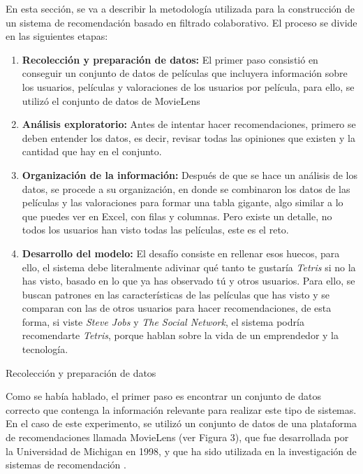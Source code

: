 \documentclass[letterpaper,10pt,final,hyphenatedtitles]{papertexKS}
\begin{document}
\begin{news}{2}
	En esta sección, se va a describir la metodología utilizada para la construcción de un sistema de recomendación basado en filtrado colaborativo. El proceso se divide en las siguientes etapas:
	\begin{enumerate}
		\item \textbf{Recolección y preparación de datos:} El primer paso consistió en conseguir un conjunto de datos de películas que incluyera información sobre los usuarios, películas y valoraciones de los usuarios por película, para ello, se utilizó el conjunto de datos de MovieLens
		\item \textbf{Análisis exploratorio:} Antes de intentar hacer recomendaciones, primero se deben entender los datos, es decir, revisar todas las opiniones que existen y la cantidad que hay en el conjunto.
		\item \textbf{Organización de la información:} Después de que se hace un análisis de los datos, se procede a su organización, en donde se combinaron los datos de las películas y las valoraciones para formar una tabla gigante, algo similar a lo que puedes ver en Excel, con filas y columnas. Pero existe un detalle, no todos los usuarios han visto todas las películas, este es el reto.
		\item \textbf{Desarrollo del modelo:} El desafío consiste en rellenar esos huecos, para ello, el sistema debe literalmente adivinar qué tanto te gustaría \textit{Tetris} si no la has visto, basado en lo que ya has observado tú y otros usuarios. Para ello, se buscan patrones en las características de las películas que has visto y se comparan con las de otros usuarios para hacer recomendaciones, de esta forma, si viste \textit{Steve Jobs} y \textit{The Social Network}, el sistema podría recomendarte \textit{Tetris}, porque hablan sobre la vida de un emprendedor y la tecnología.
	\end{enumerate}

	\begin{center}
	\end{center}

	\noindent\textcolor{color}{\Large{Recolección y preparación de datos}}
    
	Como se había hablado, el primer paso es encontrar un conjunto de datos correcto que contenga la información relevante para realizar este tipo de sistemas. En el caso de este experimento, se utilizó un conjunto de datos de una plataforma de recomendaciones llamada MovieLens (ver Figura 3), que fue desarrollada por la Universidad de Michigan en 1998, y que ha sido utilizada en la investigación de sistemas de recomendación \cite{10.1145/2827872}.


\end{news}
\end{document}
